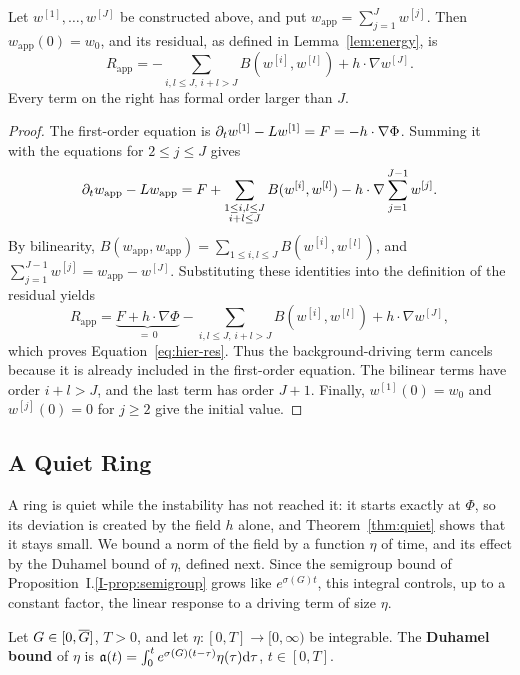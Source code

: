 \begin{lemma}
\label{lem:hier-res}
Let $w^{[1]},\dots,w^{[J]}$ be constructed above, and put
$w_{\mathrm{app}}=\sum_{j=1}^Jw^{[j]}$. Then $w_{\mathrm{app}}(0)=w_0$, and its
residual, as defined in Lemma~\ref{lem:energy}, is
\begin{equation}
\label{eq:hier-res}
R_{\mathrm{app}}=-\sum_{i,l\le J,\,i+l>J}B(w^{[i]},w^{[l]})+h\cdot\nabla w^{[J]} .
\end{equation}
Every term on the right has formal order larger than $J$.
\end{lemma}
\begin{proof}
The first-order equation is
$\partial_tw^{[1]}-L w^{[1]}=F=-h\cdot\nabla\Phi$.
Summing it with the equations for $2\le j\le J$ gives
\[
\partial_tw_{\mathrm{app}}-L w_{\mathrm{app}}
=F+\sum_{\substack{1\le i,l\le J\\i+l\le J}}B(w^{[i]},w^{[l]})
  -h\cdot\nabla\sum_{j=1}^{J-1}w^{[j]}.
\]
By bilinearity,
$B(w_{\mathrm{app}},w_{\mathrm{app}})=\sum_{1\le i,l\le J}B(w^{[i]},w^{[l]})$,
and $\sum_{j=1}^{J-1}w^{[j]}=w_{\mathrm{app}}-w^{[J]}$. Substituting these
identities into the definition of the residual yields
\[
R_{\mathrm{app}}=
\underbrace{F+h\cdot\nabla\Phi}_{=\,0}
-\sum_{i,l\le J,\,i+l>J}B(w^{[i]},w^{[l]})+h\cdot\nabla w^{[J]},
\]
which proves Equation~\eqref{eq:hier-res}. Thus the background-driving term
cancels because it is already included in the first-order equation.
The bilinear terms have order $i+l>J$, and the last term has order $J+1$.
Finally, $w^{[1]}(0)=w_0$ and $w^{[j]}(0)=0$ for $j\ge2$ give the initial value.
\end{proof}

\subsection{A Quiet Ring}

A ring is quiet while the instability has not reached it: it starts exactly at
$\Phi$, so its deviation is created by the field $h$ alone, and
Theorem~\ref{thm:quiet} shows that it stays small. We bound a norm of the field by a
function $\eta$ of time, and its effect by the Duhamel bound of $\eta$, defined
next. Since the semigroup bound of Proposition~I.\ref{I-prop:semigroup} grows like
$e^{\sigma(G)t}$, this integral controls, up to a constant factor, the linear
response to a driving term of size $\eta$.

\begin{definition}
\label{def:majorant}
Let $G\in[0,\overline{G}]$, $T>0$, and let $\eta\colon[0,T]\to[0,\infty)$ be integrable.
The \textbf{Duhamel bound} of $\eta$ is
$\mathfrak{a}(t)=\int_0^te^{\sigma(G)(t-\tau)}\eta(\tau)\dd\tau$, $t\in[0,T]$.
\end{definition}

